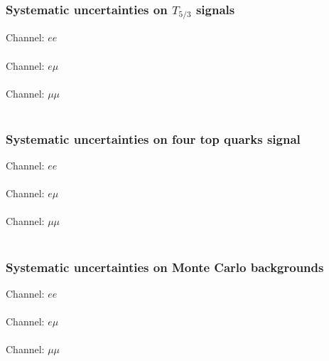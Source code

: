 \subsubsection{Systematic uncertainties on $T_{5/3}$ signals}
\begin{centering}
\tiny
Channel: $ee$ \\

\\
Channel: $e \mu$ \\

\\
Channel: $\mu \mu$ \\

\\
\label{tab:systematicsT53}
\end{centering}


\subsubsection{Systematic uncertainties on four top quarks signal}
\begin{centering}
\tiny
Channel: $ee$ \\

\\
Channel: $e \mu$ \\

\\
Channel: $\mu \mu$ \\

\\
\label{tab:systematics4t}
\end{centering}


\subsubsection{Systematic uncertainties on Monte Carlo backgrounds}
\begin{centering}
\tiny
Channel: $ee$ \\

\\
Channel: $e \mu$ \\

\\
Channel: $\mu \mu$ \\

\\
\label{tab:systematicsBG}
\end{centering}

